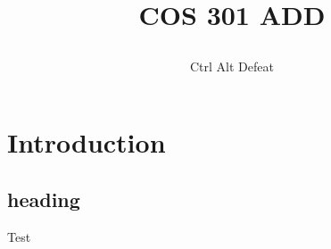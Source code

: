 \documentclass[12pt]{article}
\title{

\\
{COS 301 ADD}
}
\author{Ctrl Alt Defeat}
\begin{document}
\section{Introduction}
\subsection{heading}
Test
\end{document}
